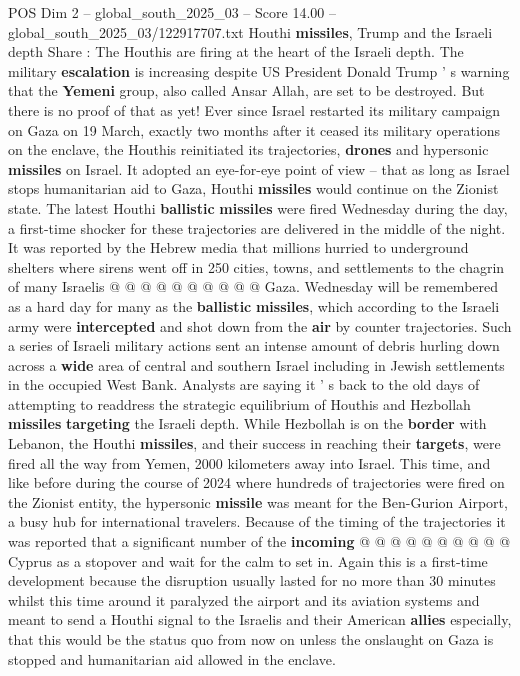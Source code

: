 \begin{textsample}{POS Dim 2 – global\_south\_2025\_03 – Score 14.00 – global\_south\_2025\_03/122917707.txt}  \label{ex:f2_pos_288}
Houthi \textbf{missiles}, Trump and the Israeli depth Share : The Houthis are firing at the heart of the Israeli depth.
The military \textbf{escalation} is increasing despite US President Donald Trump ' s warning that the \textbf{Yemeni} group, also called Ansar Allah, are set to be destroyed.
But there is no proof of that as yet!
Ever since Israel restarted its military campaign on Gaza on 19 March, exactly two months after it ceased its military operations on the enclave, the Houthis reinitiated its trajectories, \textbf{drones} and hypersonic \textbf{missiles} on Israel.
It adopted an eye-for-eye point of view -- that as long as Israel stops humanitarian aid to Gaza, Houthi \textbf{missiles} would continue on the Zionist state.
The latest Houthi \textbf{ballistic} \textbf{missiles} were fired Wednesday during the day, a first-time shocker for these trajectories are delivered in the middle of the night.
It was reported by the Hebrew media that millions hurried to underground shelters where sirens went off in 250 cities, towns, and settlements to the chagrin of many Israelis @ @ @ @ @ @ @ @ @ @ Gaza.
Wednesday will be remembered as a hard day for many as the \textbf{ballistic} \textbf{missiles}, which according to the Israeli army were \textbf{intercepted} and shot down from the \textbf{air} by counter trajectories.
Such a series of Israeli military actions sent an intense amount of debris hurling down across a \textbf{wide} area of central and southern Israel including in Jewish settlements in the occupied West Bank.
Analysts are saying it ' s back to the old days of attempting to readdress the strategic equilibrium of Houthis and Hezbollah \textbf{missiles} \textbf{targeting} the Israeli depth.
While Hezbollah is on the \textbf{border} with Lebanon, the Houthi \textbf{missiles}, and their success in reaching their \textbf{targets}, were fired all the way from Yemen, 2000 kilometers away into Israel.
This time, and like before during the course of 2024 where hundreds of trajectories were fired on the Zionist entity, the hypersonic \textbf{missile} was meant for the Ben-Gurion Airport, a busy hub for international travelers.
Because of the timing of the trajectories it was reported that a significant number of the \textbf{incoming} @ @ @ @ @ @ @ @ @ @ Cyprus as a stopover and wait for the calm to set in.
Again this is a first-time development because the disruption usually lasted for no more than 30 minutes whilst this time around it paralyzed the airport and its aviation systems and meant to send a Houthi signal to the Israelis and their American \textbf{allies} especially, that this would be the status quo from now on unless the onslaught on Gaza is stopped and humanitarian aid allowed in the enclave.

\end{textsample}
